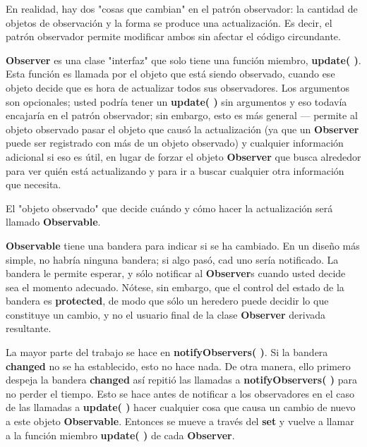 En realidad, hay dos "cosas que cambian" en el patrón observador: la cantidad de objetos de observación y la forma se produce una actualización. Es decir, el patrón observador permite modificar ambos sin afectar el código circundante.


\-\-\-\-\-\-\-\-\-\-\-\-\-  \newline

\textbf{Observer} es una clase "interfaz" que solo tiene una función miembro, \textbf{update( )}. Esta función es llamada por el objeto que está siendo observado, cuando ese objeto decide que es hora de actualizar todos sus observadores. Los argumentos son opcionales; usted podría tener un \textbf{update( )} sin argumentos y eso todavía encajaría en el patrón observador; sin embargo, esto es más general — permite al objeto observado pasar el objeto que causó la actualización (ya que un \textbf{Observer} puede ser registrado con más de un objeto observado) y cualquier información adicional si eso es útil, en lugar de forzar el objeto \textbf{Observer} que busca alrededor para ver quién está actualizando y para ir a buscar cualquier otra información que necesita.    \newline

El "objeto observado" que decide cuándo y cómo hacer la actualización será llamado \textbf{Observable}.   \newline

\textbf{Observable} tiene una bandera para indicar si se ha cambiado. En un diseño más simple, no habría ninguna bandera; si algo pasó, cad uno sería notificado. La bandera le permite esperar, y sólo notificar al \textbf{Observer}s cuando usted decide sea el momento adecuado. Nótese, sin embargo, que el control del estado de la bandera es \textbf{protected}, de modo que sólo un heredero puede decidir lo que constituye un cambio, y no el usuario final de la clase \textbf{Observer} derivada resultante.  \newline

La mayor parte del trabajo se hace en \textbf{notifyObservers( )}. Si la bandera \textbf{changed} no se ha establecido, esto no hace nada. De otra manera, ello primero despeja la bandera \textbf{changed} así repitió las llamadas a \textbf{notifyObservers( )} para no perder el tiempo. Esto se hace antes de notificar a los observadores en el caso de las llamadas a \textbf{update( )} hacer cualquier cosa que causa un cambio de nuevo a este objeto \textbf{Observable}. Entonces se mueve a través del \textbf{set} y vuelve a llamar a la función miembro \textbf{update( )} de cada \textbf{Observer}.   \newline

